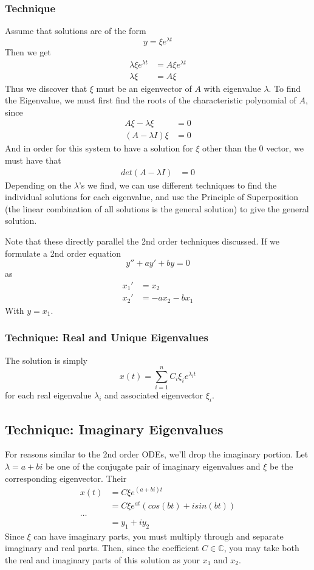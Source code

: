 \documentclass[11pt]{article}
\begin{document}
\subsubsection{Technique}
Assume that solutions are of the form
\[ y = \xi e^{\lambda t} \]
Then we get
\begin{align*}
    \lambda \xi e^{\lambda t} &= A \xi e^{\lambda t} \\
    \lambda \xi &= A \xi  
\end{align*}
Thus we discover that $\xi$ must be an eigenvector of $A$ with eigenvalue $\lambda$. To find the
Eigenvalue, we must first find the roots of the characteristic polynomial of $A$, since
\begin{align*}
    A \xi - \lambda \xi &= 0 \\
    (A - \lambda I) \xi &= 0 
\end{align*}
And in order for this system to have a solution for $\xi$ other than the 0 vector, we must have that
\begin{align*}
    det(A - \lambda I) &= 0 
\end{align*}
Depending on the $\lambda$'s we find, we can use different techniques to find the individual solutions 
for each eigenvalue, and use the Principle of Superposition (the linear combination of all solutions is
the general solution) to give the general solution.

Note that these directly parallel the 2nd order techniques discussed. If we formulate a 2nd order 
equation
\begin{equation*}
    y'' + ay' + by = 0
\end{equation*}
as 
\begin{align*}
    x_1' &= x_2 \\
    x_2' &= -ax_2 - bx_1
\end{align*}
With $y = x_1$.
\subsubsection{Technique: Real and Unique Eigenvalues}
The solution is simply
\[ x(t) = \sum_{i = 1}^n C_i \xi_i e^{\lambda_i t}  \]
for each real eigenvalue $\lambda_i$ and associated eigenvector $\xi_i$.
\subsection{Technique: Imaginary Eigenvalues}
For reasons similar to the 2nd order ODEs, we'll drop the imaginary portion. Let $\lambda = a + bi$
be one of the conjugate pair of imaginary eigenvalues and $\xi$ be the corresponding eigenvector. Their 
\begin{align*}
    x(t) &= C\xi e^{(a + bi)t} \\
         &= C\xi e^{at} (cos(bt) + isin(bt)) \\
        \dots \\
         &= y_1 + iy_2 
\end{align*}
Since $\xi$ can have imaginary parts, you must multiply through and separate imaginary and real
parts. Then, since the coefficient $C \in \mathbb{C}$, you may take both the real and imaginary parts
of this solution as your $x_1$ and $x_2$. 
\end{document}
